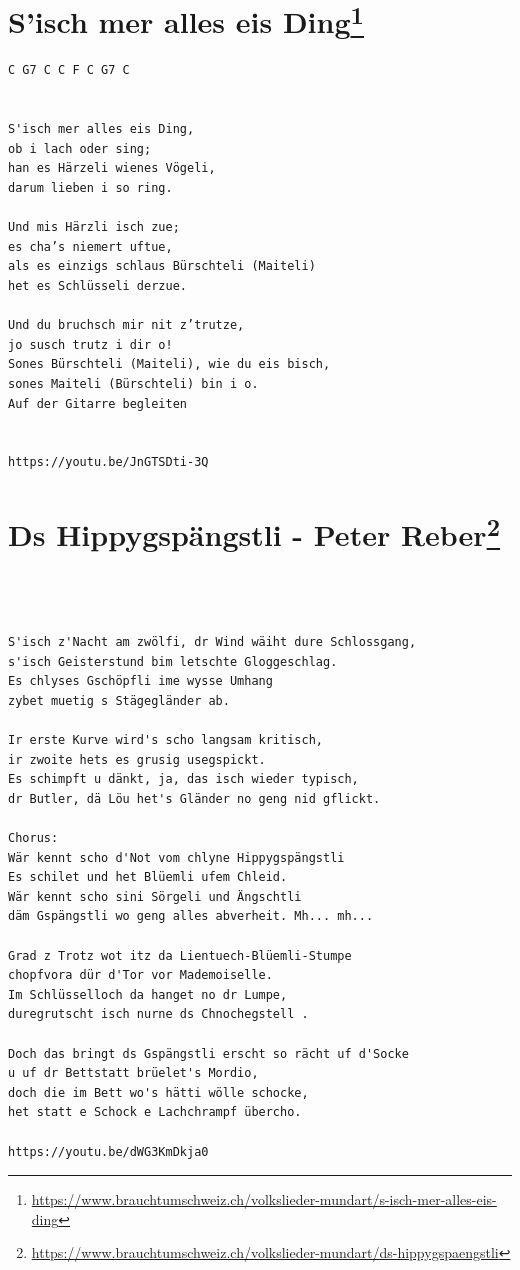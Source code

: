 \documentclass[
]{book}
\let\stdsection\section
\renewcommand\section{\clearpage\stdsection}
\begin{document}
\hypertarget{kinderlieder-isch-mer-alles-eis-ding}{%
\section[S'isch mer alles eis Ding]{\texorpdfstring{S'isch mer alles eis Ding\footnote{\url{https://www.brauchtumschweiz.ch/volkslieder-mundart/s-isch-mer-alles-eis-ding}}}{S'isch mer alles eis Ding}}\label{kinderlieder-isch-mer-alles-eis-ding}}

\begin{verbatim}
C G7 C C F C G7 C


S'isch mer alles eis Ding,
ob i lach oder sing;
han es Härzeli wienes Vögeli,
darum lieben i so ring.

Und mis Härzli isch zue;
es cha’s niemert uftue,
als es einzigs schlaus Bürschteli (Maiteli)
het es Schlüsseli derzue.

Und du bruchsch mir nit z’trutze,
jo susch trutz i dir o!
Sones Bürschteli (Maiteli), wie du eis bisch,
sones Maiteli (Bürschteli) bin i o.
Auf der Gitarre begleiten


https://youtu.be/JnGTSDti-3Q
\end{verbatim}

\hypertarget{kinderlieder-hippi-gspaengstli}{%
\section[Ds Hippygspängstli - Peter Reber]{\texorpdfstring{Ds Hippygspängstli - Peter Reber\footnote{\url{https://www.brauchtumschweiz.ch/volkslieder-mundart/ds-hippygspaengstli}}}{Ds Hippygspängstli - Peter Reber}}\label{kinderlieder-hippi-gspaengstli}}

\begin{verbatim}



S'isch z'Nacht am zwölfi, dr Wind wäiht dure Schlossgang,
s'isch Geisterstund bim letschte Gloggeschlag.
Es chlyses Gschöpfli ime wysse Umhang
zybet muetig s Stägegländer ab.

Ir erste Kurve wird's scho langsam kritisch,
ir zwoite hets es grusig usegspickt.
Es schimpft u dänkt, ja, das isch wieder typisch,
dr Butler, dä Löu het's Gländer no geng nid gflickt.

Chorus:
Wär kennt scho d'Not vom chlyne Hippygspängstli
Es schilet und het Blüemli ufem Chleid.
Wär kennt scho sini Sörgeli und Ängschtli
däm Gspängstli wo geng alles abverheit. Mh... mh...

Grad z Trotz wot itz da Lientuech-Blüemli-Stumpe
chopfvora dür d'Tor vor Mademoiselle.
Im Schlüsselloch da hanget no dr Lumpe,
duregrutscht isch nurne ds Chnochegstell .

Doch das bringt ds Gspängstli erscht so rächt uf d'Socke
u uf dr Bettstatt brüelet's Mordio,
doch die im Bett wo's hätti wölle schocke,
het statt e Schock e Lachchrampf übercho.

https://youtu.be/dWG3KmDkja0
\end{verbatim}
\end{document}
